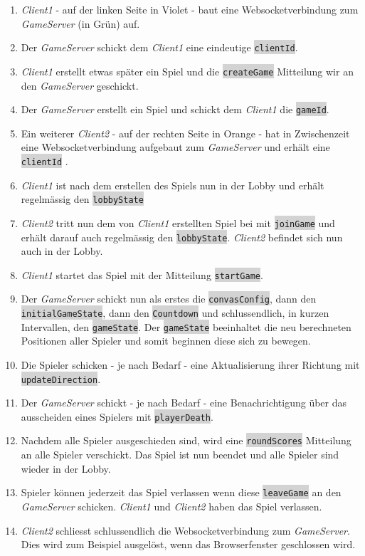 \documentclass[11pt,ngerman]{article}
\newcommand{\inlinecode}[2]{\colorbox{lightgray}{\lstinline[language=#1]$#2$}}
\begin{document}
    \begin{enumerate}
        \item \textit{Client1} - auf der linken Seite in Violet - baut eine Websocketverbindung zum \textit{GameServer} (in Grün) auf.
        \item Der \textit{GameServer} schickt dem \textit{Client1} eine eindeutige \inlinecode{bash}{clientId}.
        \item \textit{Client1} erstellt etwas später ein Spiel und die \inlinecode{bash}{createGame} Mitteilung wir an den \textit{GameServer} geschickt.
        \item Der \textit{GameServer} erstellt ein Spiel und schickt dem \textit{Client1} die \inlinecode{bash}{gameId}.
        \item Ein weiterer \textit{Client2} - auf der rechten Seite in Orange - hat in Zwischenzeit eine Websocketverbindung aufgebaut zum \textit{GameServer} und erhält eine \inlinecode{bash}{clientId} .
        \item \textit{Client1} ist nach dem erstellen des Spiels nun in der Lobby und erhält regelmässig den \inlinecode{bash}{lobbyState}
        \item \textit{Client2} tritt nun dem von \textit{Client1} erstellten Spiel bei mit \inlinecode{bash}{joinGame} und erhält darauf auch regelmässig den \inlinecode{bash}{lobbyState}. \textit{Client2} befindet sich nun auch in der Lobby.
        \item \textit{Client1} startet das Spiel mit der Mitteilung \inlinecode{bash}{startGame}.
        \item Der \textit{GameServer} schickt nun als erstes die \inlinecode{bash}{convasConfig}, dann den \inlinecode{bash}{initialGameState}, dann den \inlinecode{bash}{Countdown} und schlussendlich, in kurzen Intervallen, den \inlinecode{bash}{gameState}. Der \inlinecode{bash}{gameState} beeinhaltet die neu berechneten Positionen aller Spieler und somit beginnen diese sich zu bewegen.
        \item Die Spieler schicken - je nach Bedarf - eine Aktualisierung ihrer Richtung mit \inlinecode{bash}{updateDirection}.
        \item Der \textit{GameServer} schickt - je nach Bedarf - eine Benachrichtigung über das ausscheiden eines Spielers mit \inlinecode{bash}{playerDeath}.
        \item Nachdem alle Spieler ausgeschieden sind, wird eine \inlinecode{bash}{roundScores} Mitteilung an alle Spieler verschickt. Das Spiel ist nun beendet und alle Spieler sind wieder in der Lobby.
        \item Spieler können jederzeit das Spiel verlassen wenn diese \inlinecode{bash}{leaveGame} an den \textit{GameServer} schicken. \textit{Client1} und \textit{Client2} haben das Spiel verlassen.
        \item \textit{Client2} schliesst schlussendlich die Websocketverbindung zum \textit{GameServer}. Dies wird zum Beispiel ausgelöst, wenn das Browserfenster geschlossen wird.
    \end{enumerate}
\end{document}
